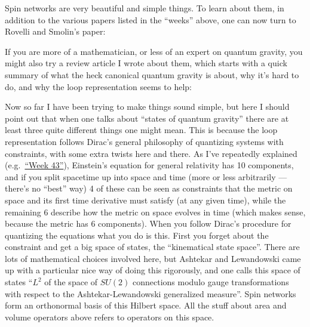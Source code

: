 \documentclass{article}
\def\tightlist{}
\renewcommand{\texttt}[1]{%
  \begingroup
  \ttfamily
  \begingroup\lccode`~=`/\lowercase{\endgroup\def~}{/\discretionary{}{}{}}%
  \begingroup\lccode`~=`[\lowercase{\endgroup\def~}{[\discretionary{}{}{}}%
  \begingroup\lccode`~=`.\lowercase{\endgroup\def~}{.\discretionary{}{}{}}%
  \catcode`/=\active\catcode`[=\active\catcode`.=\active
  \scantokens{#1\noexpand}%
  \endgroup
}
\begin{document}
Spin networks are very beautiful and simple things. To learn about them,
in addition to the various papers listed in the ``weeks'' above, one can
now turn to Rovelli and Smolin's paper:


If you are more of a mathematician, or less of an expert on quantum
gravity, you might also try a review article I wrote about them, which
starts with a quick summary of what the heck canonical quantum gravity
is about, why it's hard to do, and why the loop representation seems to
help:


Now so far I have been trying to make things sound simple, but here I
should point out that when one talks about ``states of quantum gravity''
there are at least three quite different things one might mean. This is
because the loop representation follows Dirac's general philosophy of
quantizing systems with constraints, with some extra twists here and
there. As I've repeatedly explained
(e.g.~\protect\hyperlink{week43}{``Week 43''}), Einstein's equation for
general relativity has 10 components, and if you split spacetime up into
space and time (more or less arbitrarily --- there's no ``best'' way) 4
of these can be seen as constraints that the metric on space and its
first time derivative must satisfy (at any given time), while the
remaining 6 describe how the metric on space evolves in time (which
makes sense, because the metric has 6 components). When you follow
Dirac's procedure for quantizing the equations what you do is this.
First you forget about the constraint and get a big space of states, the
``kinematical state space''. There are lots of mathematical choices
involved here, but Ashtekar and Lewandowski came up with a particular
nice way of doing this rigorously, and one calls this space of states
``\(L^2\) of the space of \(SU(2)\) connections modulo gauge
transformations with respect to the Ashtekar-Lewandowski generalized
measure''. Spin networks form an orthonormal basis of this Hilbert
space. All the stuff about area and volume operators above refers to
operators on this space.
\end{document}
